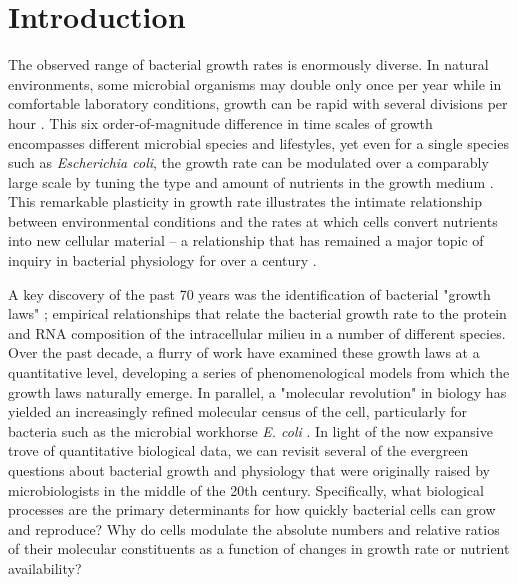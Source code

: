 \section{Introduction}
The observed range of bacterial growth rates is enormously diverse. In natural
environments, some microbial organisms may double only once per year
\citep{mikucki2009} while in comfortable laboratory conditions, growth can be
rapid with several divisions per hour \citep{schaechter1958}. This six
order-of-magnitude difference in time scales of growth encompasses different
microbial species and lifestyles, yet even for a single species such as
\textit{Escherichia coli}, the growth rate can be modulated over a comparably
large scale by tuning the type and amount of nutrients in the growth medium
\citep{liu2005a}. This remarkable plasticity in growth rate illustrates the
intimate relationship between environmental conditions and the rates at which
cells convert nutrients into new cellular material -- a relationship that has
remained a major topic of inquiry in bacterial physiology for over a century
\citep{jun2018}.


A key discovery of the past 70 years was the identification of bacterial "growth
laws" \citep{schaechter1958}; empirical relationships that relate the bacterial
growth rate to the protein and RNA composition of the intracellular milieu in a
number of different species. Over the past decade, a flurry of work
\citep{molenaar2009, scott2010, klumpp2014, basan2015, dai2016, erickson2017}
have examined these growth laws at a quantitative level, developing a series of
phenomenological models from which the growth laws naturally emerge. In
parallel, a "molecular revolution" in biology has yielded an increasingly
refined molecular census of the cell, particularly for bacteria such as the
microbial workhorse \textit{E. coli} \citep{schmidt2016, davidi2016a}. In light
of the now expansive trove of quantitative biological data, we can revisit
several of the evergreen questions about bacterial growth and physiology that
were originally raised by microbiologists in the middle of the 20th century.
Specifically, what biological processes are the primary determinants for how
quickly bacterial cells can grow and reproduce? Why do cells modulate the
absolute numbers and relative ratios of their molecular constituents as a
function of changes in growth rate or nutrient availability?

